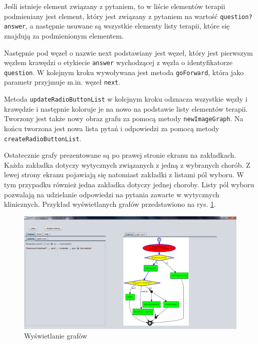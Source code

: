 Jeśli istnieje element związany z pytaniem, to w liście elementów terapii podmieniany jest element, który jest związany z pytaniem na wartość \texttt{question?answer}, a następnie usuwane są wszystkie elementy listy terapii, które się znajdują za podmienionym elementem. 

Następnie pod węzeł o nazwie next podstawiany jest węzeł, który jest pierwszym węzłem krawędzi o etykiecie \texttt{answer} wychodzącej z węzła o identyfikatorze \texttt{question}. W kolejnym kroku wywoływana jest metoda \texttt{goForward}, która jako parametr przyjmuje m.in. węzeł \texttt{next}. 

Metoda \texttt{updateRadioButtonList} w kolejnym kroku odznacza wszystkie węzły i krawędzie i następnie koloruje je na nowo na podstawie listy elementów terapii. Tworzony jest także nowy obraz grafu za pomocą metody \texttt{newImageGraph}. Na końcu tworzona jest nowa lista pytań i odpowiedzi za pomocą metody \texttt{createRadioButtonList}. 


Ostatecznie grafy prezentowane są po prawej stronie ekranu na zakładkach. Każda zakładka dotyczy wytycznych związanych z jedną z wybranych chorób. Z lewej strony ekranu pojawiają się natomiast zakładki z listami pól wyboru. W tym przypadku również jedna zakładka dotyczy jednej choroby. Listy pól wyboru pozwalają na udzielanie odpowiedzi na pytania zawarte w wytycznych klinicznych. Przykład wyświetlanych grafów przedstawiono na rys. \ref{fig:wyswietlanie_grafow}.
\begin{figure}[H]
\centering
\includegraphics[width=\textwidth]{img/wyswietlanie_grafow.png}
\caption{Wyświetlanie grafów}
\label{fig:wyswietlanie_grafow}
\end{figure}

